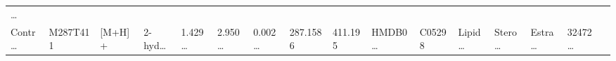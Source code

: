 \documentclass[
]{article}
\begin{document}
\begin{longtable}[]{@{}llllllllllllllll@{}}
\begin{minipage}[t]{0.02\columnwidth}
\ldots{}\strut
\end{minipage}\tabularnewline
\begin{minipage}[t]{0.04\columnwidth}\raggedright
Contr\ldots{}\strut
\end{minipage} & \begin{minipage}[t]{0.04\columnwidth}\raggedright
M287T411\strut
\end{minipage} & \begin{minipage}[t]{0.04\columnwidth}\raggedright
{[}M+H{]}+\strut
\end{minipage} & \begin{minipage}[t]{0.04\columnwidth}\raggedright
2-hyd\ldots{}\strut
\end{minipage} & \begin{minipage}[t]{0.04\columnwidth}\raggedright
1.429\ldots{}\strut
\end{minipage} & \begin{minipage}[t]{0.04\columnwidth}\raggedright
2.950\ldots{}\strut
\end{minipage} & \begin{minipage}[t]{0.04\columnwidth}\raggedright
0.002\ldots{}\strut
\end{minipage} & \begin{minipage}[t]{0.04\columnwidth}\raggedright
287.1586\strut
\end{minipage} & \begin{minipage}[t]{0.04\columnwidth}\raggedright
411.195\strut
\end{minipage} & \begin{minipage}[t]{0.04\columnwidth}\raggedright
HMDB0\ldots{}\strut
\end{minipage} & \begin{minipage}[t]{0.03\columnwidth}\raggedright
C05298\strut
\end{minipage} & \begin{minipage}[t]{0.04\columnwidth}\raggedright
Lipid\ldots{}\strut
\end{minipage} & \begin{minipage}[t]{0.04\columnwidth}\raggedright
Stero\ldots{}\strut
\end{minipage} & \begin{minipage}[t]{0.04\columnwidth}\raggedright
Estra\ldots{}\strut
\end{minipage} & \begin{minipage}[t]{0.04\columnwidth}\raggedright
32472\ldots{}\strut
\end{minipage} & \begin{minipage}[t]{0.02\columnwidth}\raggedright

\end{minipage}
\end{longtable}
\end{document}
